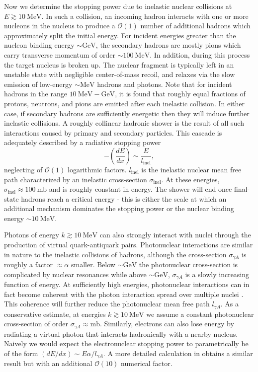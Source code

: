 \documentclass[twocolumn,showpacs,preprintnumbers,amsmath,amssymb,prd]{revtex4}
\newcommand{\OO}{\mathcal{O}}
\newcommand{\GeV}{\text{GeV}}
\newcommand{\MeV}{\text{MeV}}
\def\r{\right)}
\def\l{\left(}
\begin{document}
\begin{appendices}
Now we determine the stopping power due to inelastic nuclear collisions at $E \gtrsim 10 ~\MeV$.  
In such a collision, an incoming hadron interacts with one or more nucleons in the nucleus to produce a $\OO(1)$ number of additional hadrons which approximately split the initial energy. 
For incident energies greater than the nucleon binding energy $\sim \GeV$, the secondary hadrons are mostly pions which carry transverse momentum of order $\sim 100 ~\MeV$. 
In addition, during this process the target nucleus is broken up. 
The nuclear fragment is typically left in an unstable state with negligible center-of-mass recoil, and relaxes via the slow emission of low-energy $\sim \MeV$ hadrons and photons. 
Note that for incident hadrons in the range $10 ~\MeV - \GeV$, it is found that roughly equal fractions of protons, neutrons, and pions are emitted after each inelastic collision. 
In either case, if secondary hadrons are sufficiently energetic then they will induce further inelastic collisions.
A roughly collinear hadronic shower is the result of all such interactions caused by primary and secondary particles.
This cascade is adequately described by a radiative stopping power
\begin{equation}
\label{eq:nucshower}
-\l \frac{dE}{dx}\r \sim \frac{E}{l_\text{inel}},
\end{equation}
neglecting of $\OO(1)$ logarithmic factors.
$l_\text{inel}$ is the inelastic nuclear mean free path characterized by an inelastic cross-section $\sigma_\text{inel}$.
At these energies, $\sigma_\text{inel} \approx 100 ~\text{mb}$ and is roughly constant in energy. 
The shower will end once final-state hadrons reach a critical energy - this is either the scale at which an additional mechanism dominates the stopping power or the nuclear binding energy $\sim 10 ~\MeV$.

Photons of energy $k \gtrsim 10 ~\text{MeV}$ can also strongly interact with nuclei through the production of virtual quark-antiquark pairs. 
Photonuclear interactions are similar in nature to the inelastic collisions of hadrons, although the cross-section $\sigma_{\gamma A}$ is roughly a factor $\approx \alpha$ smaller. 
Below $\sim \GeV$ the photonuclear cross-section is complicated by nuclear resonances while above $\sim \GeV$, $\sigma_{\gamma A}$ is a slowly increasing function of energy. 
At sufficiently high energies, photonuclear interactions can in fact become coherent with the photon interaction spread over multiple nuclei \cite{Gerhardt:2010bj}.
This coherence will further reduce the photonuclear mean free path $l_{\gamma A}$. 
As a conservative estimate, at energies $k \gtrsim 10 ~\text{MeV}$ we assume a constant photonuclear cross-section of order $\sigma_{\gamma A} \approx \text{mb}$. 
Similarly, electrons can also lose energy by radiating a virtual photon that interacts hadronically with a nearby nucleus.
Naively we would expect the electronuclear stopping power to parametrically be of the form $(dE/dx) \sim E \alpha/l_{\gamma A}$.
A more detailed calculation in \cite{Gerhardt:2010bj} obtains a similar result but with an additional $\OO(10)$ numerical factor. 
\end{appendices}
\end{document}
